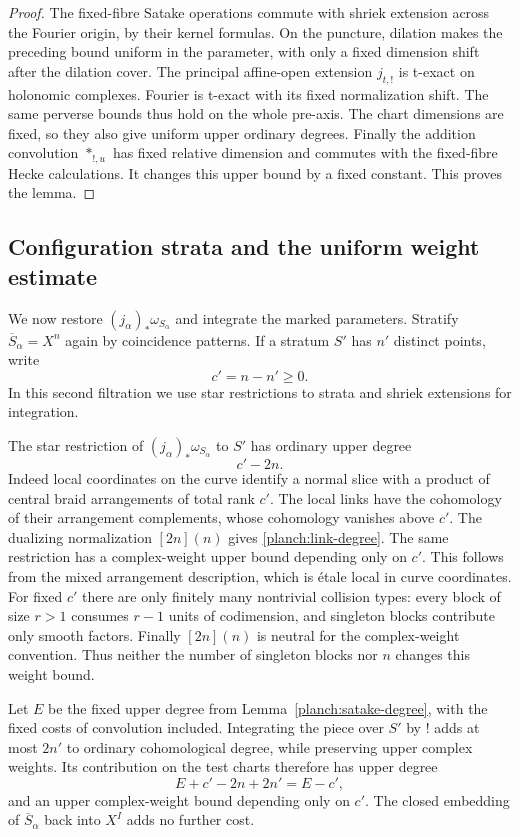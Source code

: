 \documentclass[11pt]{article}
\numberwithin{equation}{section}
\theoremstyle{definition}
\theoremstyle{remark}
\begin{document}
\begin{proof}
The fixed-fibre Satake operations commute with shriek extension
across the Fourier origin, by their kernel formulas.  On the
puncture, dilation makes the preceding bound uniform in the
parameter, with only a fixed dimension shift after the dilation
cover.  The principal affine-open extension $j_{t,!}$ is t-exact
on holonomic complexes.  Fourier is t-exact with its fixed
normalization shift.  The same perverse bounds thus hold on the
whole pre-axis.  The chart dimensions are fixed, so they also give
uniform upper ordinary degrees.  Finally the addition convolution
$*_{!,u}$ has fixed relative dimension and commutes with the
fixed-fibre Hecke calculations.  It changes this upper bound by a
fixed constant.  This proves the lemma.
\end{proof}

\subsection{Configuration strata and the uniform weight estimate}
\label{planch:configuration-estimate}

We now restore $(j_\alpha)_*\omega_{S_\alpha}$ and integrate the
marked parameters.  Stratify $\overline S_\alpha=X^n$ again by
coincidence patterns.  If a stratum $S'$ has $n'$ distinct points,
write
\[
 c'=n-n'\geq0.
\]
In this second filtration we use star restrictions to strata and
shriek extensions for integration.

The star restriction of $(j_\alpha)_*\omega_{S_\alpha}$ to $S'$
has ordinary upper degree
\begin{equation}
 c'-2n.
 \label{planch:link-degree}
\end{equation}
Indeed local coordinates on the curve identify a normal slice with
a product of central braid arrangements of total rank $c'$.  The
local links have the cohomology of their arrangement complements,
whose cohomology vanishes above $c'$.  The dualizing normalization
$[2n](n)$ gives \eqref{planch:link-degree}.
The same restriction has a complex-weight upper bound depending
only on $c'$.  This follows from the mixed arrangement description,
which is \'etale local in curve coordinates.  For fixed $c'$ there
are only finitely many nontrivial collision types: every block of
size $r>1$ consumes $r-1$ units of codimension, and singleton blocks
contribute only smooth factors.  Finally $[2n](n)$ is neutral for
the complex-weight convention.  Thus neither the number of singleton
blocks nor $n$ changes this weight bound.

Let $E$ be the fixed upper degree from
Lemma~\ref{planch:satake-degree}, with the fixed costs of convolution
included.  Integrating the piece over $S'$ by $!$ adds at most
$2n'$ to ordinary cohomological degree, while preserving upper
complex weights.  Its contribution on the test charts therefore
has upper degree
\begin{equation}
 E+c'-2n+2n'=E-c',
 \label{planch:codimension-decay}
\end{equation}
and an upper complex-weight bound depending only on $c'$.
The closed embedding of $\overline S_\alpha$ back into $X^I$ adds
no further cost.
\end{document}
